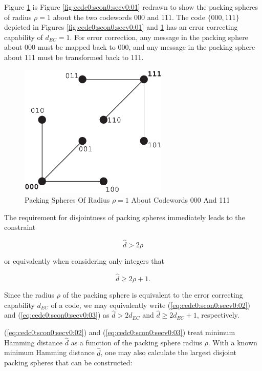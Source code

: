 Figure \ref{fig:cedc0:scon0:secv0:02} is
Figure \ref{fig:cedc0:scon0:secv0:01} redrawn to show the packing spheres of
radius $\rho=1$ about the two codewords 000 and 111.  The code
$\{000,111\}$ depicted in Figures \ref{fig:cedc0:scon0:secv0:01} and
\ref{fig:cedc0:scon0:secv0:02} has an error correcting capability of 
$d_{EC}=1$.  For error correction, any message in the packing sphere
about 000 must be mapped back to 000, and any message in the packing sphere
about 111 must be transformed back to 111.

\begin{figure}
\centering
\includegraphics[height=2.5in]{c_edc0/cube02.eps}
\caption{Packing Spheres Of Radius $\rho{}=1$ About Codewords 000 And 111}
\label{fig:cedc0:scon0:secv0:02}
\end{figure}

The requirement for disjointness of packing spheres immediately leads to
the constraint

\begin{equation}
\label{eq:cedc0:scon0:secv0:02}
\hat{d} > 2 \rho 
\end{equation}

\noindent{}or equivalently when considering only integers that

\begin{equation}
\label{eq:cedc0:scon0:secv0:03}
\hat{d} \geq 2 \rho + 1 . 
\end{equation}

\noindent{}Since the radius $\rho$ of the packing sphere is 
equivalent to the error correcting capability $d_{EC}$ of
a code, we may equivalently write 
(\ref{eq:cedc0:scon0:secv0:02}) and (\ref{eq:cedc0:scon0:secv0:03})
as $\hat{d} > 2 d_{EC}$ and $\hat{d} \geq 2 d_{EC} + 1$, respectively.

(\ref{eq:cedc0:scon0:secv0:02}) and (\ref{eq:cedc0:scon0:secv0:03})
treat minimum Hamming distance $\hat{d}$ as a function of 
the packing sphere radius $\rho$.  With a known minimum Hamming distance 
$\hat{d}$, one may also calculate the largest disjoint
packing spheres that can be constructed:


